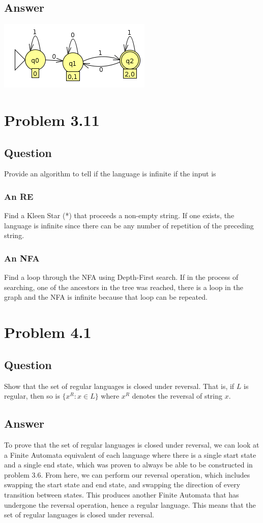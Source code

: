 \documentclass[12pt, a4paper]{article}
\begin{document}
\subsection{Answer}
\begin{center}
\includegraphics[scale=0.7]{3.9}
\end{center}

\section{Problem 3.11}
\subsection{Question}
Provide an algorithm to tell if the language is infinite if the input is
\subsubsection{An RE}
Find a Kleen Star (*) that proceeds a non-empty string. If one exists, the language is infinite since there can be any number of repetition of the preceding string.
\subsubsection{An NFA}
Find a loop through the NFA using Depth-First search. If in the process of searching, one of the ancestors in the tree was reached, there is a loop in the graph and the NFA is infinite because that loop can be repeated.

\section{Problem 4.1}
\subsection{Question}
Show that the set of regular languages is closed under reversal. That is, if $L$ is regular, then so is $\{x^{R} : x \in L\}$ where $x^{R}$ denotes the reversal of string $x$.
\subsection{Answer}
To prove that the set of regular languages is closed under reversal, we can look at a Finite Automata equivalent of each language where there is a single start state and a single end state, which was proven to always be able to be constructed in problem 3.6. From here, we can perform our reversal operation, which includes swapping the start state and end state, and swapping the direction of every transition between states. This produces another Finite Automata that has undergone the reversal operation, hence a regular language. This means that the set of regular languages is closed under reversal.
\end{document}
